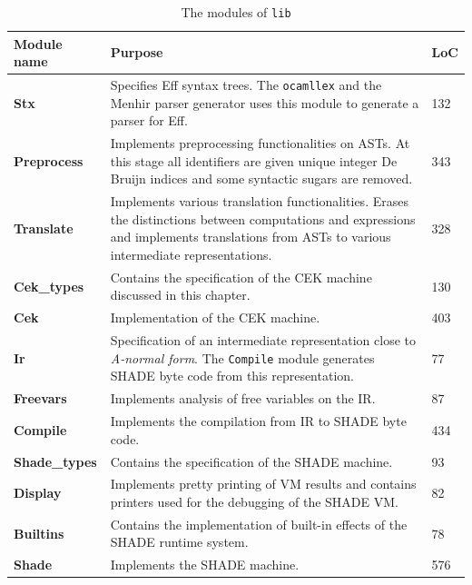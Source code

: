 \documentclass[class=article, crop=false]{standalone}
\begin{document}
\begin{table}[ht]
    \small
    \centering
    {\renewcommand{\arraystretch}{1.3}
    \begin{tabular}{lp{10cm}l}
    \toprule
    \textbf{Module name} & \textbf{Purpose} & \textbf{LoC} \\
    \midrule
    \textbf{Stx} & 
        Specifies Eff syntax trees. The \verb|ocamllex| and the Menhir parser
        generator uses this module to generate a parser for Eff. &
        132 \\
    \textbf{Preprocess} &
        Implements preprocessing functionalities on ASTs. At this stage all
        identifiers are given unique integer De Bruijn indices
        and some syntactic sugars are removed.  &
        343 \\
    \textbf{Translate} &
        Implements various translation functionalities. Erases the distinctions
        between computations and expressions and implements translations from
        ASTs to various intermediate representations. &
        328 \\
    \textbf{Cek\_types} & Contains the specification of the CEK machine
        discussed in this chapter. &
        130 \\
    \textbf{Cek} &
        Implementation of the CEK machine. &
        403 \\
    \textbf{Ir} &
        Specification of an intermediate representation close to \emph{A-normal
        form}. The \verb|Compile| module generates SHADE byte code from this
        representation. &
        77 \\
    \textbf{Freevars} &
        Implements analysis of free variables on the IR. &
        87 \\
    \textbf{Compile} &
        Implements the compilation from IR to SHADE byte code. &
        434 \\
    \textbf{Shade\_types} &
        Contains the specification of the SHADE machine. &
        93 \\
    \textbf{Display} &
        Implements pretty printing of VM results and contains printers used for
        the debugging of the SHADE VM. &
        82 \\
    \textbf{Builtins} &
        Contains the implementation of built-in effects of the SHADE runtime
        system. &
        78 \\
    \textbf{Shade} &
        Implements the SHADE machine. &
        576 \\
    \bottomrule
    \end{tabular}}
    \caption[OCaml modules and their purpose]{The modules of \texttt{lib}}
    \label{tab:lib-modules}
\end{table}
\end{document}
